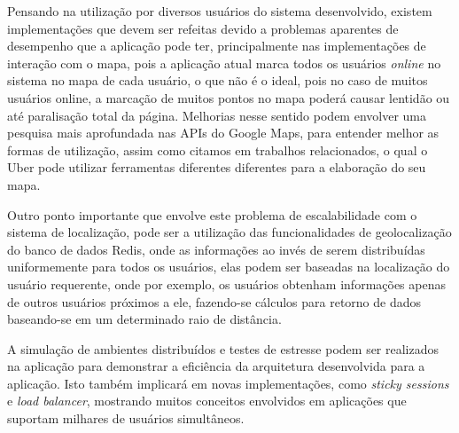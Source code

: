 Pensando na utilização por diversos usuários do sistema desenvolvido, existem implementações que devem ser refeitas devido a problemas aparentes de desempenho que a aplicação pode ter, principalmente nas implementações de interação com o mapa, pois a aplicação atual marca todos os usuários \textit{online} no sistema no mapa de cada usuário, o que não é o ideal, pois no caso de muitos usuários online, a marcação de muitos pontos no mapa poderá causar lentidão ou até paralisação total da página. Melhorias nesse sentido podem envolver uma pesquisa mais aprofundada nas APIs do Google Maps, para entender melhor as formas de utilização, assim como citamos em trabalhos relacionados, o qual o Uber pode utilizar ferramentas diferentes diferentes para a elaboração do seu mapa. 

Outro ponto importante que envolve este problema de escalabilidade com o sistema de localização, pode ser a utilização das funcionalidades de geolocalização do banco de dados Redis, onde as informações ao invés de serem distribuídas uniformemente para todos os usuários, elas podem ser baseadas na localização do usuário requerente, onde por exemplo, os usuários obtenham informações apenas de outros usuários próximos a ele, fazendo-se cálculos para retorno de dados baseando-se em um determinado raio de distância.

A simulação de ambientes distribuídos e testes de estresse podem ser realizados na aplicação para demonstrar a eficiência da arquitetura desenvolvida para a aplicação. Isto também implicará em novas implementações, como \textit{sticky sessions} e \textit{load balancer}, mostrando muitos conceitos envolvidos em aplicações que suportam milhares de usuários simultâneos.
